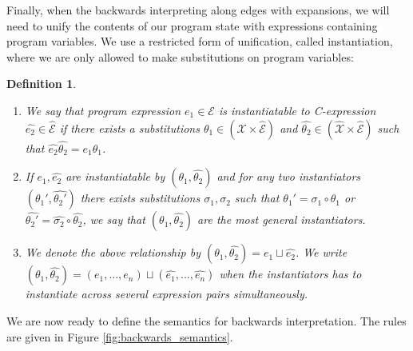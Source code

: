\documentclass[10pt]{../sigplanconf}
\newcommand{\w}[1]{\ensuremath{\widehat{#1}}}
\newtheorem{definition}{Definition}
\begin{document}
Finally, when the backwards interpreting along edges with expansions,
we will need to unify the contents of our program state with
expressions containing program variables. We use a restricted form of
unification, called instantiation, where we are only allowed to make
substitutions on program variables:
\begin{definition}
\begin{enumerate}
\item We say that program expression $e_1 \in \mathcal{E}$ is
  \emph{instantiatable} to C-expression $\w{e_2} \in \w{\mathcal{E}}$
  if there exists a substitutions $\theta_1 \in (\mathcal{X} \times
  \w{\mathcal{E}})$ and $\w{\theta_2} \in (\w{\mathcal{X}} \times
  \w{\mathcal{E}})$ such that $\w{e_2} \w{\theta_2} = e_1 \theta_1$.
\item If $e_1, \w{e_2}$ are instantiatable by $(\theta_1,
  \w{\theta_2})$ and for any two instantiators $(\theta_1',
  \w{\theta_2'})$ there exists substitutions $\sigma_1, \w{\sigma_2}$
  such that $\theta_1' = \sigma_1 \circ \theta_1$ or $\w{\theta_2'} =
  \w{\sigma_2} \circ \w{\theta_2}$, we say that $(\theta_1,
  \w{\theta_2})$ are the most general instantiators.
\item We denote the above relationship by $(\theta_1, \w{\theta_2}) =
  e_1 \sqcup \w{e_2}$. We write $(\theta_1, \w{\theta_2}) = (e_1, ...,
  e_n) \sqcup (\w{e_1}, ..., \w{e_n})$ when the instantiators has to
  instantiate across several expression pairs simultaneously.
\end{enumerate}
\end{definition}

We are now ready to define the semantics for backwards
interpretation. The rules are given in Figure
\ref{fig:backwards_semantics}.
\end{document}
